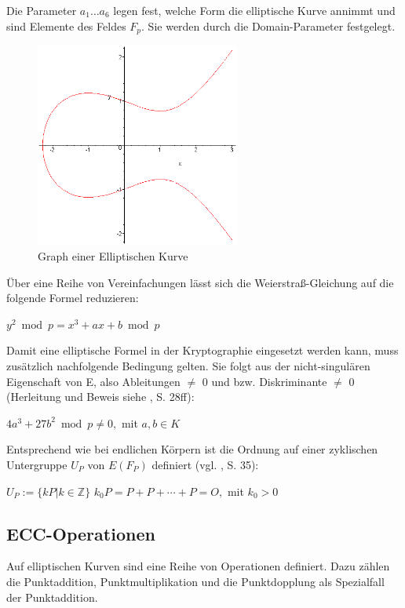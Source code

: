 Die Parameter $a_1 \dots a_6$ legen fest, welche Form die elliptische Kurve annimmt und sind Elemente des Feldes $F_p$. Sie werden durch die Domain-Parameter festgelegt. 

\begin{figure}[H]
	\centering
   \includegraphics[width=0.60\textwidth]{bilder/ellkurve}
	\caption{Graph einer Elliptischen Kurve}
	\label{fig:ellkurve}
\end{figure}

Über eine Reihe von Vereinfachungen lässt sich die Weierstraß-Gleichung auf die folgende Formel reduzieren:  %
\begin{center}
$ y^2 \bmod p = x^3 + a x + b \bmod p $
\end{center}

Damit eine elliptische Formel in der Kryptographie eingesetzt werden kann, muss zusätzlich nachfolgende Bedingung gelten. Sie folgt aus der nicht-singulären Eigenschaft von E, also Ableitungen $\ne$ 0 und bzw. Diskriminante $\ne$ 0 (Herleitung und Beweis siehe \cite{grebe}, S. 28ff):
\begin{center}
$ 4 a^3 + 27 b^2 \bmod p \ne 0, $ mit $ a,b \in K $
\end{center}

Entsprechend wie bei endlichen Körpern ist die Ordnung auf einer zyklischen Untergruppe $U_P$ von $E(F_P)$ definiert (vgl. \cite{grebe}, S. 35):
\begin{center}
$ U_P := \{ k P | k \in \mathbb{Z} \}$
$k_0 P = P + P + \cdots + P = O, $ mit $ k_0 > 0$
\end{center}

\subsection{ECC-Operationen}
Auf elliptischen Kurven sind eine Reihe von Operationen definiert. Dazu zählen die Punktaddition, Punktmultiplikation und die Punktdopplung als Spezialfall der Punktaddition.

